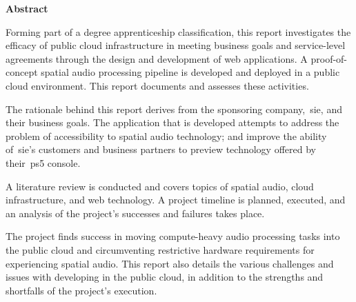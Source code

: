 \thispagestyle{plain}
\begin{center}
    \vspace{0.9cm}
    \textbf{Abstract}
\end{center}

Forming part of a degree apprenticeship classification, this report investigates the efficacy of public cloud infrastructure in meeting business goals and service-level agreements through the design and development of web applications.
A proof-of-concept spatial audio processing pipeline is developed and deployed in a public cloud environment.
This report documents and assesses these activities.

The rationale behind this report derives from the sponsoring company,~\gls{sie}, and their business goals.
The application that is developed attempts to address the problem of accessibility to spatial audio technology;
and improve the ability of~\gls{sie}'s customers and business partners to preview technology offered by their~\gls{ps5} console.

A literature review is conducted and covers topics of spatial audio, cloud infrastructure, and web technology.
A project timeline is planned, executed, and an analysis of the project's successes and failures takes place.

The project finds success in moving compute-heavy audio processing tasks into the public cloud and circumventing restrictive hardware requirements for experiencing spatial audio.
This report also details the various challenges and issues with developing in the public cloud, in addition to the strengths and shortfalls of the project's execution.
